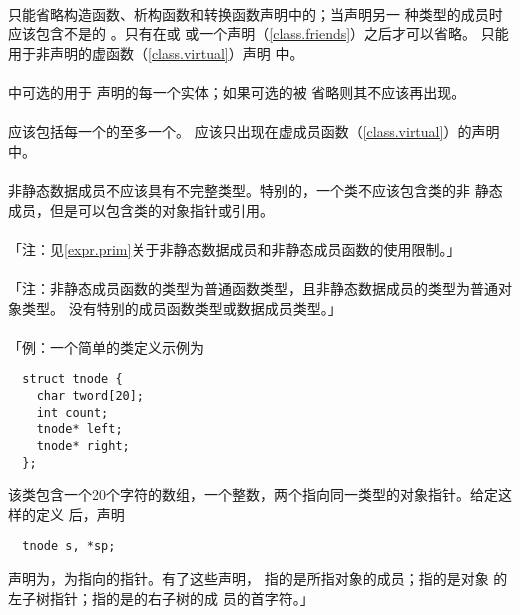 \paragraph{}
只能省略构造函数、析构函数和转换函数声明中的；当声明另一
种类型的成员时应该包含不是的
。只有在或
或一个声明（\ref{class.friends}）之后才可以省略。
只能用于非声明的虚函数（\ref{class.virtual}）声明
中。

\paragraph{}
中可选的用于
声明的每一个实体；如果可选的被
省略则其不应该再出现。

\paragraph{}
应该包括每一个的至多一个。
应该只出现在虚成员函数（\ref{class.virtual}）的声明中。

\paragraph{}
非静态数据成员不应该具有不完整类型。特别的，一个类不应该包含类的非
静态成员，但是可以包含类的对象指针或引用。

\paragraph{}
「注：见\ref{expr.prim}关于非静态数据成员和非静态成员函数的使用限制。」

\paragraph{}
「注：非静态成员函数的类型为普通函数类型，且非静态数据成员的类型为普通对象类型。
没有特别的成员函数类型或数据成员类型。」

\paragraph{}
「例：一个简单的类定义示例为
\begin{lstlisting}
  struct tnode {
    char tword[20];
    int count;
    tnode* left;
    tnode* right;
  };
\end{lstlisting}
该类包含一个20个字符的数组，一个整数，两个指向同一类型的对象指针。给定这样的定义
后，声明
\begin{lstlisting}
  tnode s, *sp;
\end{lstlisting}
声明为，为指向的指针。有了这些声明，
指的是所指对象的成员；指的是对象
的左子树指针；指的是的右子树的成
员的首字符。」

